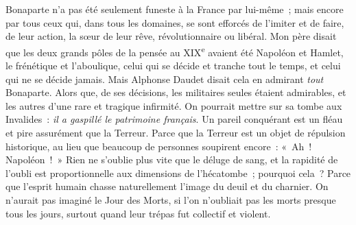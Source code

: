 \documentclass[french,twoside]{book} %
\begin{document}
Bonaparte n’a pas été seulement funeste à la France par lui-même ; mais encore par tous ceux qui, dans tous les domaines, se sont efforcés de l’imiter et de faire, de leur action, la sœur de leur rêve, révolutionnaire ou libéral. Mon père disait que les deux grands pôles de la pensée au XIX\textsuperscript{e} avaient été Napoléon et Hamlet, le frénétique et l’aboulique, celui qui se décide et tranche tout le temps, et celui qui ne se décide jamais. Mais Alphonse Daudet disait cela en admirant {\itshape tout} Bonaparte. Alors que, de ses décisions, les militaires seules étaient admirables, et les autres d’une rare et tragique infirmité. On pourrait mettre sur sa tombe aux Invalides : {\itshape il a gaspillé le patrimoine français}. Un pareil conquérant est un fléau et pire assurément que la Terreur. Parce que la Terreur est un objet de répulsion historique, au lieu que beaucoup de personnes soupirent encore : « Ah ! Napoléon ! » Rien ne s’oublie plus vite que le déluge de sang, et la rapidité de l’oubli est proportionnelle aux dimensions de l’hécatombe ; pourquoi cela ? Parce que l’esprit humain chasse naturellement l’image du deuil et du charnier. On n’aurait pas imaginé le Jour des Morts, si l’on n’oubliait pas les morts presque tous les jours, surtout quand leur trépas fut collectif et violent.\par
\end{document}

